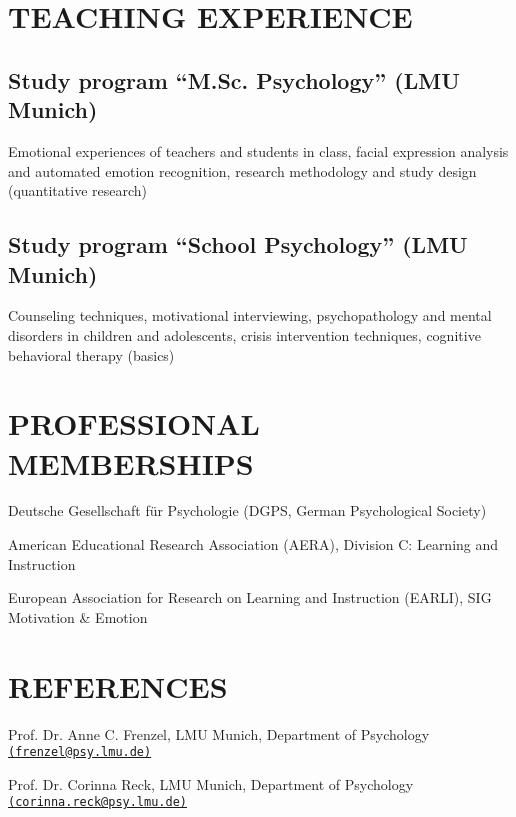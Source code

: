 \documentclass[letterpaper]{article}
\renewenvironment{itemize}{ %
  \begin{list}{}{ %
    \setlength{\leftmargin}{2.5em} %
  }
}{
  \end{list}
}
\begin{document}
\section*{TEACHING EXPERIENCE}
\subsection*{Study program “M.Sc. Psychology” (LMU Munich)}
\begin{itemize}
\item Emotional experiences of teachers and students in class, facial expression analysis and automated emotion recognition, research methodology and study design (quantitative research)
\end{itemize}

\subsection*{Study program “School Psychology” (LMU Munich)}
\begin{itemize}
\item Counseling techniques, motivational interviewing, psychopathology and mental disorders in children and adolescents, crisis intervention techniques, cognitive behavioral therapy (basics)
\end{itemize}


\section*{PROFESSIONAL MEMBERSHIPS}
\begin{itemize}
\item[$\ast$] Deutsche Gesellschaft für Psychologie (DGPS, German Psychological Society)
\item[$\ast$] American Educational Research Association (AERA), Division C: Learning and Instruction
\item[$\ast$] European Association for Research on Learning and Instruction (EARLI), SIG Motivation \& Emotion
\end{itemize}


\section*{REFERENCES}
\begin{itemize}
\item[$\ast$] Prof. Dr. Anne C. Frenzel, LMU Munich, Department of Psychology \href{mailto:frenzel@psy.lmu.de}{\tt (frenzel@psy.lmu.de)} 
\item[$\ast$] Prof. Dr. Corinna Reck, LMU Munich, Department of Psychology \href{mailto:corinna.reck@psy.lmu.de}{\tt (corinna.reck@psy.lmu.de)} 
\end{itemize}

\begin{center} 


\end{center}
\end{document}
